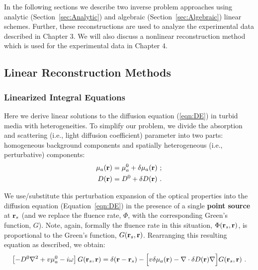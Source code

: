 In the following sections we describe two inverse problem approaches using analytic (Section~\ref{sec:Analytic}) and algebraic (Section~\ref{sec:Algebraic}) linear schemes. Further, these reconstructions are used to analyze the experimental data described in Chapter 3. We will also discuss a nonlinear reconstruction method which is used for the experimental data in Chapter 4.
%
\subsection{Linear Reconstruction Methods}
\label{sec:linearrecon}
\subsubsection{Linearized Integral Equations}
\label{sec:rytov}
Here we derive linear solutions to the diffusion equation (\ref{eqn:DE}) in turbid media with heterogeneities. To simplify our problem, we divide the absorption and scattering (i.e., light diffusion coefficient) parameter into two parts: homogeneous background components and spatially heterogeneous (i.e., perturbative) components:
%
\begin{align}
\mu_a(\mathbf{r}) &= \mu_a^0+\delta\mu_a(\mathbf{r}) \ ; \\
D(\mathbf{r}) &= D^0+\delta D(\mathbf{r}) \ .
\end{align}

We use/substitute this perturbation expansion of the optical properties into the diffusion equation (Equation~\ref{eqn:DE}) in the presence of a single \textbf{point source} at $\mathbf{r}_s$ (and we replace the fluence rate, $\Phi$, with the corresponding Green's function, $G$). Note, again, formally the fluence rate in this situation, $\Phi(\mathbf{r}_s,\mathbf{r})$, is proportional to the Green's function, $G(\mathbf{r}_s,\mathbf{r})$. Rearranging this resulting equation as described, we obtain:
%
\begin{equation}
\label{eqn:DEdiff}
\left[ - D^0 \nabla^2 + v\mu_a^0 - i\omega \right]G(\mathbf{r}_s,\mathbf{r})= \delta(\mathbf{r}-\mathbf{r}_s) - \Big[v\delta\mu_a(\mathbf{r})-\nabla \cdot \delta D(\mathbf{r})\nabla\Big] G(\mathbf{r}_s,\mathbf{r}) \ .
\end{equation}

